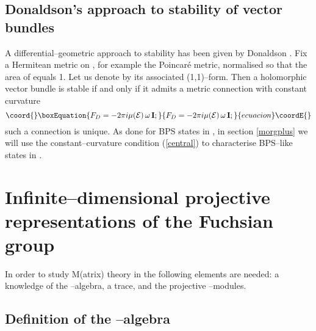 \documentclass[a4paper,a4paper]{article}
\begin{document}
\subsection{Donaldson's approach to stability of vector  
bundles}\label{donapp}  
  
A differential--geometric approach to stability has been given by Donaldson  
\cite{DONALDSON}. Fix a Hermitean metric on \myHighlight{$\Sigma$}\coordHE{}, for example the Poincar\'e  
metric, normalised so that the area of \myHighlight{$\Sigma$}\coordHE{} equals 1. Let us denote by  
\myHighlight{$\omega$}\coordHE{} its associated (1,1)--form. Then a holomorphic vector bundle is stable 
if and only if it admits a metric connection \coordHE{} with constant curvature  
\begin{equation}\coord{}\boxEquation{  
F_D=-2\pi i \mu({\cal E}) \,\omega \,{{\bf  I}};
\label{central}
}{  
F_D=-2\pi i \mu({\cal E}) \,\omega \,{{\bf  I}};
}{ecuacion}\coordE{}\end{equation} 
such a connection \coordHE{} is unique. As done for BPS states in \coordHE{} 
\cite{SCHWARZ}, in section \ref{morgplus} we will use the constant--curvature 
condition (\ref{central}) to characterise BPS--like states in \coordHE{}.  

\section{Infinite--dimensional projective representations of the Fuchsian 
group \myHighlight{$\Gamma$}\coordHE{}}\label{gimmeanameforthis}  
 
In order to study M(atrix) theory in \coordHE{} the following elements are needed: 
a knowledge of the \coordHE{}--algebra, a trace, and the projective \coordHE{}--modules. 

\subsection{Definition of the \coordHE{}--algebra \coordHE{}}\label{defcstar} 
\end{document}
